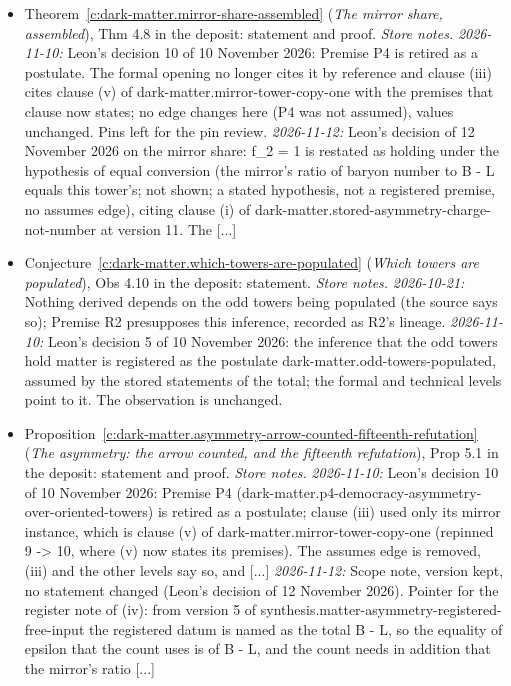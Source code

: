 \documentclass[11pt]{article}
\theoremstyle{definition}
\theoremstyle{plain}
\begin{document}
\begin{itemize}
\item Theorem~\ref{c:dark-matter.mirror-share-assembled} (\emph{The mirror share, assembled}), Thm 4.8 in the deposit: statement and proof. \emph{Store notes.} \emph{2026-11-10:} Leon's decision 10 of 10 November 2026: Premise P4 is retired as a postulate. The formal opening no longer cites it by reference and clause (iii) cites clause (v) of dark-matter.mirror-tower-copy-one with the premises that clause now states; no edge changes here (P4 was not assumed), values unchanged. Pins left for the pin review. \emph{2026-11-12:} Leon's decision of 12 November 2026 on the mirror share: f\_2 = 1 is restated as holding under the hypothesis of equal conversion (the mirror's ratio of baryon number to B - L equals this tower's; not shown; a stated hypothesis, not a registered premise, no assumes edge), citing clause (i) of dark-matter.stored-asymmetry-charge-not-number at version 11. The [...]
\item Conjecture~\ref{c:dark-matter.which-towers-are-populated} (\emph{Which towers are populated}), Obs 4.10 in the deposit: statement. \emph{Store notes.} \emph{2026-10-21:} Nothing derived depends on the odd towers being populated (the source says so); Premise R2 presupposes this inference, recorded as R2's lineage. \emph{2026-11-10:} Leon's decision 5 of 10 November 2026: the inference that the odd towers hold matter is registered as the postulate dark-matter.odd-towers-populated, assumed by the stored statements of the total; the formal and technical levels point to it. The observation is unchanged.
\item Proposition~\ref{c:dark-matter.asymmetry-arrow-counted-fifteenth-refutation} (\emph{The asymmetry: the arrow counted, and the fifteenth refutation}), Prop 5.1 in the deposit: statement and proof. \emph{Store notes.} \emph{2026-11-10:} Leon's decision 10 of 10 November 2026: Premise P4 (dark-matter.p4-democracy-asymmetry-over-oriented-towers) is retired as a postulate; clause (iii) used only its mirror instance, which is clause (v) of dark-matter.mirror-tower-copy-one (repinned 9 -> 10, where (v) now states its premises). The assumes edge is removed, (iii) and the other levels say so, and [...] \emph{2026-11-12:} Scope note, version kept, no statement changed (Leon's decision of 12 November 2026). Pointer for the register note of (iv): from version 5 of synthesis.matter-asymmetry-registered-free-input the registered datum is named as the total B - L, so the equality of epsilon that the count uses is of B - L, and the count needs in addition that the mirror's ratio [...]

\end{itemize}
\end{document}
